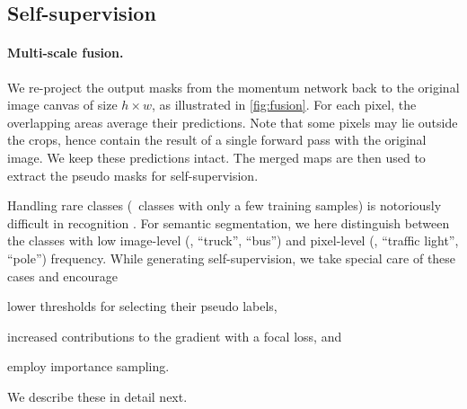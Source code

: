 \subsection{Self-supervision}
\label{sec:selftrain}

\paragraph{Multi-scale fusion.}
We re-project the output masks from the momentum network back to the original image canvas of size $h \times w$, as illustrated in \cref{fig:fusion}.
For each pixel, the overlapping areas average their predictions.
Note that some pixels may lie outside the crops, hence contain the result of a single forward pass with the original image.
We keep these predictions intact.
The merged maps are then used to extract the pseudo masks for self-supervision.

Handling rare classes (\ie\ classes with only a few training samples) is notoriously difficult in recognition \cite{GuptaDG19}.
For semantic segmentation, we here distinguish between the classes with low image-level (\eg, ``truck'', ``bus'') and pixel-level (\eg, ``traffic light'', ``pole'') frequency.
While generating self-supervision, we take special care of these cases and encourage
\begin{enumerate*}[label=(\roman*), font=\itshape]
  \item lower thresholds for selecting their pseudo labels,
  \item increased contributions to the gradient with a focal loss, and
  \item employ importance sampling.
\end{enumerate*}
We describe these in detail next.

